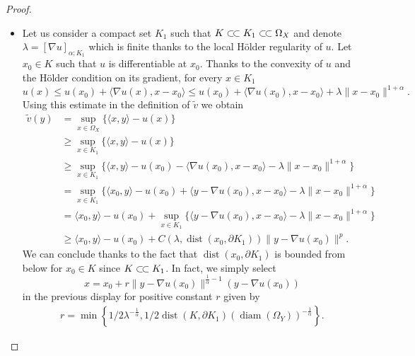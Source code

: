 \documentclass[reqno,12pt]{article}
\DeclareMathOperator{\dist}{dist}
\DeclareMathOperator{\diam}{diam}
\newcommand{\ssubset}{\subset\joinrel\subset}
\begin{document}
\begin{proof}
\begin{itemize}
\item[(ii)] Let us consider a compact set $K_1$ such that $K \ssubset K_1 \ssubset \Omega_X$ and denote $\lambda=[\nabla u]_{\alpha;K_1}$ which is finite thanks to the local H\"{o}lder regularity of $u$. Let $x_0 \in K$ such that $u$ is differentiable at $x_0$. Thanks to the convexity of $u$ and the H\"{o}lder condition on its gradient, for every $x \in K_1$
 \[
 u(x) \leqslant u(x_0) + \langle \nabla u (x) , x-x_0 \rangle \leqslant  u(x_0)+ \langle \nabla u (x_0) , x-x_0 \rangle + \lambda \| x-x_0\|^{1+\alpha}.
 \]
Using this estimate in the definition of $\tilde{v}$ we obtain
\begin{align*}
    \tilde{v}(y) &= \sup_{x \in \Omega_X} \{ \langle x,y\rangle - u(x)  \}  \\
    &\geqslant \sup_{x \in K_1} \{ \langle x,y\rangle - u(x)  \}  \\
    & \geqslant \sup_{x \in K_1} \{ \langle x,y\rangle - u(x_0) - \langle \nabla u (x_0) , x-x_0 \rangle - \lambda \| x-x_0\|^{1+\alpha}  \} \\
    & = \sup_{x \in K_1} \{ \langle x_0,y\rangle - u(x_0)  + \langle y-\nabla u (x_0) , x-x_0 \rangle - \lambda \| x-x_0\|^{1+\alpha}  \} \\
    & = \langle x_0,y\rangle - u(x_0) +\sup_{x \in K_1} \{ \langle y-\nabla u (x_0) , x-x_0 \rangle - \lambda \| x-x_0\|^{1+\alpha}  \} \\
     & \geqslant \langle x_0,y\rangle - u(x_0) +  C(\lambda,\dist(x_0, \partial K_1))\| y- \nabla u (x_0)\|^p.
\end{align*}
We can conclude thanks to the fact that $\dist(x_0, \partial K_1)$ is bounded from below for $x_0 \in K$ since $K \ssubset K_1$. In fact, we simply select 
$$x = x_{0} + r\|y-\nabla u(x_0)\|^{\frac{1}{\alpha}-1}(y-\nabla u(x_0))$$
in the previous display for positive constant $r$ given by
\begin{align*}
    r = \min\left\{1/2\lambda^{-\frac{1}{\alpha}}, 1/2\dist(K,\partial K_{1})(\diam(\Omega_{Y}))^{-\frac{1}{\alpha}}\right\}.
\end{align*}
\end{itemize}
\end{proof}
\end{document}
